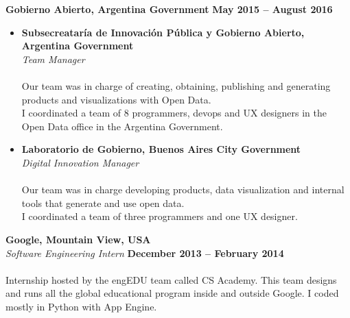 \documentclass[margin,line]{resume}
\begin{document}
\begin{resume}
\textbf{Gobierno Abierto, Argentina Government}\vspace{2mm}\vspace{1mm} \hfill \textbf{May 2015 -- August 2016}\vspace{-3mm}\\\vspace{-1mm}

\begin{itemize}
\item \textbf{Subsecreatar\'ia de Innovaci\'on P\'ublica y Gobierno Abierto, Argentina Government}\vspace{2mm}\\\vspace{1mm}
\textsl{Team Manager} \hfill \vspace{-3mm}\\\vspace{-1mm}
\\
Our team was in charge of creating, obtaining, publishing and generating products and visualizations with Open Data.
\\
I coordinated a team of 8 programmers, devops and UX designers in the Open Data office in the Argentina Government. 


\item \textbf{Laboratorio de Gobierno, Buenos Aires City Government}\vspace{2mm}\\\vspace{1mm}
\textsl{Digital Innovation Manager} \hfill \vspace{-3mm}\\\vspace{-1mm}
\\
Our team was in charge developing products, data visualization and internal tools that generate and use open data.
\\
I coordinated a team of three programmers and one UX designer. 

\end{itemize}





\newpage



\textbf{Google, Mountain View, USA}\vspace{2mm}\\\vspace{1mm}
\textsl{Software Engineering Intern} \hfill \textbf{December 2013 -- February 2014}\vspace{-3mm}\\\vspace{-1mm}
\\
Internship hosted by the engEDU team called CS Academy. This team designs and runs all the global educational program inside and outside Google. I coded mostly in Python with App Engine.


\end{resume}
\end{document}
